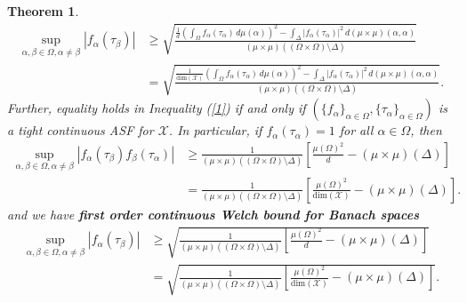 \documentclass{amsart}
\newtheorem{theorem}{Theorem}[section]
\begin{document}
\begin{theorem}
  \begin{align*}
  	\sup _{\alpha, \beta \in \Omega, \alpha\neq \beta}|f_\alpha(\tau_\beta)|&\geq \sqrt{\frac{\frac{1}{d}	\left(\int_{\Omega}
  			f_\alpha(\tau_\alpha)\, d \mu(\alpha)\right)^2-	\int_{\Delta}|f_\alpha(\tau_\alpha)|^2\, d(\mu\times\mu)(\alpha,\alpha)}{(\mu\times\mu)((\Omega\times\Omega)\setminus\Delta)}}\\
  		&=\sqrt{\frac{\frac{1}{\text{dim}(\mathcal{X})}	\left(\int_{\Omega}
  				f_\alpha(\tau_\alpha)\, d \mu(\alpha)\right)^2-	\int_{\Delta}|f_\alpha(\tau_\alpha)|^2\, d(\mu\times\mu)(\alpha,\alpha)}{(\mu\times\mu)((\Omega\times\Omega)\setminus\Delta)}}.
  \end{align*}
  Further, equality holds in Inequality (\ref{1}) if and only if $ (\{f_\alpha\}_{\alpha\in \Omega}, \{\tau_\alpha\}_{\alpha\in \Omega}) $ is  a tight continuous  ASF for $\mathcal{X}$. 
  In particular, if $f_\alpha(\tau_\alpha)=1$ for all $\alpha \in \Omega$, then 
  \begin{align*}
  	\sup _{\alpha, \beta \in \Omega, \alpha\neq \beta}|f_\alpha(\tau_\beta)f_\beta(\tau_\alpha)|&\geq \frac{1}{(\mu\times\mu)((\Omega\times\Omega)\setminus\Delta)}\left[\frac{\mu(\Omega)^2}{d}-(\mu\times\mu)(\Delta)\right]\\
  	&=\frac{1}{(\mu\times\mu)((\Omega\times\Omega)\setminus\Delta)}\left[\frac{\mu(\Omega)^2}{\text{dim}(\mathcal{X})}-(\mu\times\mu)(\Delta)\right]. 
  \end{align*}
  and we have \textbf{first order continuous Welch bound for Banach spaces}
  \begin{align*}
  	 	\sup _{\alpha, \beta \in \Omega, \alpha\neq \beta}|f_\alpha(\tau_\beta)|&\geq \sqrt{\frac{1}{(\mu\times\mu)((\Omega\times\Omega)\setminus\Delta)}\left[\frac{\mu(\Omega)^2}{d}-(\mu\times\mu)(\Delta)\right]}\\
  	 	&= \sqrt{\frac{1}{(\mu\times\mu)((\Omega\times\Omega)\setminus\Delta)}\left[\frac{\mu(\Omega)^2}{\text{dim}(\mathcal{X})}-(\mu\times\mu)(\Delta)\right]}.
  \end{align*}
  \end{theorem}
\end{document}

